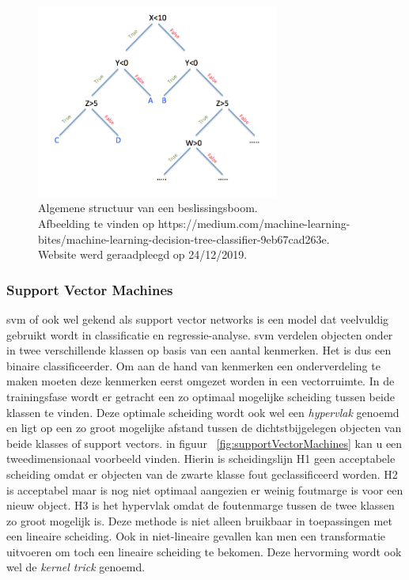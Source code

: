		\begin{figure}
			\centering
			\includegraphics[width=80mm]{afbeeldingen/beslissingsBoom.PNG}
			\caption{Algemene structuur van een beslissingsboom. \\Afbeelding te vinden op https://medium.com/machine-learning-bites/machine-learning-decision-tree-classifier-9eb67cad263e.\\ Website werd geraadpleegd op 24/12/2019.}
			\label{fig:beslissingsBoom}
		\end{figure}
		
		
	
	
	\subsubsection{Support Vector Machines}
	\gls{svm} of ook wel gekend als support vector networks is een model dat veelvuldig gebruikt wordt in classificatie en regressie-analyse. \gls{svm} verdelen objecten onder in twee verschillende klassen op basis van een aantal kenmerken. Het is dus een binaire classificeerder. Om aan de hand van kenmerken een onderverdeling te maken moeten deze kenmerken eerst omgezet worden in een vectorruimte. In de trainingsfase wordt er getracht een zo optimaal mogelijke scheiding tussen beide klassen te vinden. Deze optimale scheiding wordt ook wel een \textit{hypervlak} genoemd en ligt op een zo groot mogelijke afstand tussen de dichtstbijgelegen objecten van beide klasses of support vectors. in figuur ~\ref{fig:supportVectorMachines} kan u een tweedimensionaal voorbeeld vinden. Hierin is scheidingslijn H1 geen acceptabele scheiding omdat er objecten van de zwarte klasse fout geclassificeerd worden. H2 is acceptabel maar is nog niet optimaal aangezien er weinig foutmarge is voor een nieuw object. H3 is het hypervlak omdat de foutenmarge tussen de twee klassen zo groot mogelijk is. Deze methode is niet alleen bruikbaar in toepassingen met een lineaire scheiding. Ook in niet-lineaire gevallen kan men een transformatie uitvoeren om toch een lineaire scheiding te bekomen. Deze hervorming wordt ook wel de \textit{kernel trick}\cite{sun2018kernel} genoemd. 
	
